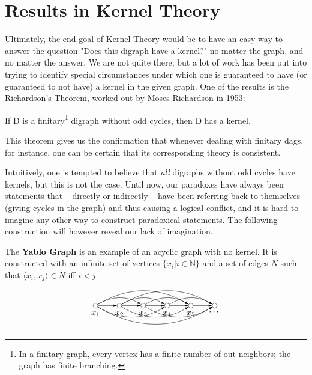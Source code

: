 \section{Results in Kernel Theory}
\label{sec:Results in Kernel Theory}
Ultimately, the end goal of Kernel Theory would be to have an easy way to answer the question "Does this digraph have a kernel?" no matter the graph, and no matter the answer.
We are not quite there, but a lot of work has been put into trying to identify special circumstances under which one is guaranteed to have (or guaranteed to not have) a kernel in the given graph.
One of the results is the Richardson's Theorem, worked out by Moses Richardson in 1953:\\

\begin{theorem}
  \cite{am-richardson} If D is a finitary\footnote{In a finitary graph, every vertex has a finite number of out-neighbors; the graph has finite branching.} digraph without odd cycles, then D has a kernel.
\end{theorem}
This theorem gives us the confirmation that whenever dealing with finitary dags, for instance, one can be certain that its corresponding theory is consistent.

Intuitively, one is tempted to believe that \textit{all} digraphs without odd cycles have kernels, but this is not the case.
Until now, our paradoxes have always been statements that -- directly or indirectly -- have been referring back to themselves (giving cycles in the graph) and thus causing a logical conflict, and it is hard to imagine any other way to construct paradoxical statements.
The following construction will however reveal our lack of imagination.

The \textbf{Yablo Graph} \cite{analysis-yablo} is an example of an acyclic graph with no kernel. It is constructed with an infinite set of vertices $\{ x_i | i \in \mathbb{N} \}$ and a set of edges $N$ such that $\langle x_i, x_j \rangle \in N$ iff $i < j$.
\[
  \begin{tikzpicture}
    [
    point/.style={circle,draw,inner sep=0pt,minimum size=2mm},
    collection/.style={thick,rectangle,draw,inner sep=0pt,minimum height=14mm, minimum width= 9mm}
    ]
    \node (1) at (0,1) [point,label=below:$x_1$] {};
    \node (2) at (1,1) [point,label=below:$x_2$] {};
    \node (3) at (2,1) [point,label=below:$x_3$] {};
    \node (4) at (3,1) [point,label=below:$x_4$] {};
    \node (5) at (4,1) [point,label=below:$x_5$] {};
    \node (6) at (5,1) [point,label=below:$\dots$] {};
    \draw [-latex] (1) to (2);
    \draw [-latex] (2) to (3);
    \draw [-latex] (3) to (4);
    \draw [-latex] (4) to (5);
    \draw [-latex] (5) to (6);
    \draw [-latex, bend left] (1) to (3);
    \draw [-latex, bend left] (2) to (4);
    \draw [-latex, bend left] (3) to (5);
    \draw [-latex, bend left] (4) to (6);
    \draw [-latex, bend right] (1) to (4);
    \draw [-latex, bend right] (2) to (5);
    \draw [-latex, bend right] (3) to (6);
    \draw [-latex, bend left] (1) to (5);
    \draw [-latex, bend left] (2) to (6);
    \draw [-latex, bend right] (1) to (6);
  \end{tikzpicture}
\]

